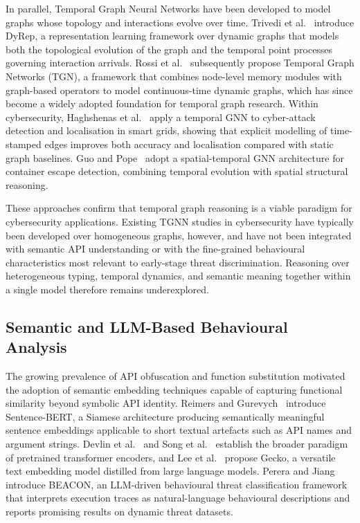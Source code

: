 \documentclass[%
    BCOR=10mm,
    DIV=13,
    toc=bibliography,
    toc=listof,
    oneside,
    12pt,
]{scrbook}
\begin{document}
In parallel, Temporal Graph Neural Networks have been developed to model graphs
whose topology and interactions evolve over time. Trivedi et
al.~\cite{dyrep2019} introduce DyRep, a representation learning framework over
dynamic graphs that models both the topological evolution of the graph and the
temporal point processes governing interaction arrivals. Rossi et
al.~\cite{tgn2020} subsequently propose Temporal Graph Networks (TGN), a
framework that combines node-level memory modules with graph-based operators
to model continuous-time dynamic graphs, which has since become a widely
adopted foundation for temporal graph research. Within cybersecurity,
Haghshenas et al.~\cite{haghshenas2023temporal} apply a temporal GNN to
cyber-attack detection and localisation in smart grids, showing that explicit
modelling of time-stamped edges improves both accuracy and localisation
compared with static graph baselines. Guo and Pope~\cite{guopope2023} adopt a
spatial-temporal GNN architecture for container escape detection, combining
temporal evolution with spatial structural reasoning.

These approaches confirm that temporal graph reasoning is a viable paradigm
for cybersecurity applications. Existing TGNN studies in cybersecurity have
typically been developed over homogeneous graphs, however, and have not been
integrated with semantic API understanding or with the fine-grained behavioural
characteristics most relevant to early-stage threat discrimination. Reasoning
over heterogeneous typing, temporal dynamics, and semantic meaning together
within a single model therefore remains underexplored.

\subsection{Semantic and LLM-Based Behavioural Analysis}
\label{subsec:semantic_llm}

The growing prevalence of API obfuscation and function substitution motivated
the adoption of semantic embedding techniques capable of capturing functional
similarity beyond symbolic API identity. Reimers and
Gurevych~\cite{reimers2019sbert} introduce Sentence-BERT, a Siamese
architecture producing semantically meaningful sentence embeddings applicable
to short textual artefacts such as API names and argument strings. Devlin et
al.~\cite{devlin2019bert} and Song et al.~\cite{mpnet2020} establish the
broader paradigm of pretrained transformer encoders, and Lee et
al.~\cite{lee2024gecko} propose Gecko, a versatile text embedding model
distilled from large language models. Perera and
Jiang~\cite{perera2023beacon} introduce BEACON, an LLM-driven behavioural
threat classification framework that interprets execution traces as
natural-language behavioural descriptions and reports promising results on
dynamic threat datasets.
\end{document}
